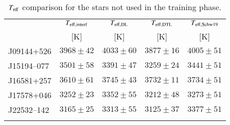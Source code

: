 \documentclass{aa}
\begin{document}
\begin{table}[]
\caption{$T_{\rm eff}$ comparison for the stars not used in the training phase.}
\label{tab:teff_uncert}
\centering %
\begin{adjustbox}{width=0.49\textwidth}
\begin{tabular}{l cccc}
    \hline 
    \hline 
    \noalign{\smallskip}
\multicolumn{1}{c}{Karmn} & \multicolumn{1}{c}{$T_{\rm eff, interf}$} & \multicolumn{1}{c}{$T_{\rm eff, DL}$} & \multicolumn{1}{c}{$T_{\rm eff, DTL}$} & \multicolumn{1}{c}{$T_{\rm eff, Schw19}$}\\
 & [K] & [K] & [K] & [K] \\
\noalign{\smallskip}
\hline
\noalign{\smallskip}
J09144+526 & $3968 \pm 42$ & $4033 \pm 60$ & $3877 \pm 16$ & $4005 \pm 51$ \\
J15194--077 & $3501 \pm 58$ & $3391 \pm 47$ & $3259 \pm 24$ & $3441 \pm 51$ \\
J16581+257 & $3610 \pm 61$ & $3745 \pm 43$ & $3732 \pm 11$ & $3734 \pm 51$ \\
J17578+046 & $3252 \pm 23$ & $3352 \pm 55$ & $3212 \pm 48$ & $3273 \pm 51$ \\
J22532--142 & $3165 \pm 25$ & $3313 \pm 55$ & $3125 \pm 37$ & $3377 \pm 51$ \\
\noalign{\smallskip}
\hline
\end{tabular}
\end{adjustbox}
\end{table}
\end{document}

